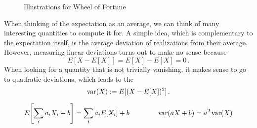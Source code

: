\begin{figure}
\centering


%
\hspace{0.04\textwidth}
%

\caption{Illustrations for Wheel of Fortune}
\label{fig:wheel_of_fortune}
\end{figure}



When thinking of the expectation as an average, we can think of many interesting quantities to compute it for. A simple idea, which is complementary to the expectation itself, is the average deviation of realizations from their average. However, measuring linear deviations turns out to make no sense because
\begin{equation*}
E[X - E[X]] = E[X] - E[X] = 0 \, .
\end{equation*}
When looking for a quantity that is not trivially vanishing, it makes sense to go to quadratic deviations, which leads to the 
\begin{equation}
\operatorname{var}(X) := E[(X - E[X])^2] \, .
\end{equation}


\begin{prop}
\begin{equation}
E\qty[\sum_i a_i X_i + b] = \sum_i a_i E[X_i] + b \qquad \qquad \operatorname{var}(a X + b) = a^2 \operatorname{var}(X)
\end{equation}
\end{prop}



